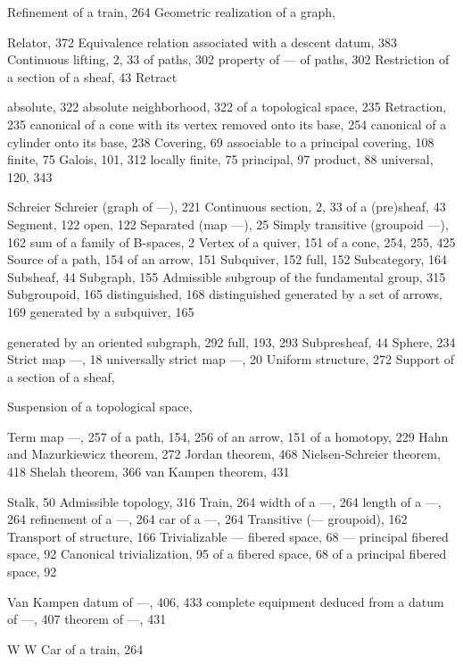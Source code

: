 
Refinement of a train, 264 Geometric realization of a graph,

Relator, 372 Equivalence relation associated with a descent datum, 383 Continuous lifting, 2, 33 of paths, 302 property of --- of paths, 302 Restriction of a section of a sheaf, 43 Retract

absolute, 322 absolute neighborhood, 322 of a topological space, 235 Retraction, 235 canonical of a cone with its vertex removed onto its base, 254 canonical of a cylinder onto its base, 238 Covering, 69 associable to a principal covering, 108 finite, 75 Galois, 101, 312 locally finite, 75 principal, 97 product, 88 universal, 120, 343


Schreier Schreier (graph of ---), 221 Continuous section, 2, 33 of a (pre)sheaf, 43 Segment, 122 open, 122 Separated (map ---), 25 Simply transitive (groupoid ---), 162 sum of a family of B-spaces, 2 Vertex of a quiver, 151 of a cone, 254, 255, 425 Source of a path, 154 of an arrow, 151 Subquiver, 152 full, 152 Subcategory, 164 Subsheaf, 44 Subgraph, 155 Admissible subgroup of the fundamental group, 315 Subgroupoid, 165 distinguished, 168 distinguished generated by a set of arrows, 169 generated by a subquiver, 165

generated by an oriented subgraph, 292 full, 193, 293 Subpresheaf, 44 Sphere, 234 Strict map ---, 18 universally strict map ---, 20 Uniform structure, 272 Support of a section of a sheaf,

Suspension of a topological space,


Term map ---, 257 of a path, 154, 256 of an arrow, 151 of a homotopy, 229 Hahn and Mazurkiewicz theorem, 272 Jordan theorem, 468 Nielsen-Schreier theorem, 418 Shelah theorem, 366 van Kampen theorem, 431

Stalk, 50 Admissible topology, 316 Train, 264 width of a ---, 264 length of a ---, 264 refinement of a ---, 264 car of a ---, 264 Transitive (--- groupoid), 162 Transport of structure, 166 Trivializable --- fibered space, 68 --- principal fibered space, 92 Canonical trivialization, 95 of a fibered space, 68 of a principal fibered space, 92


Van Kampen datum of ---, 406, 433 complete equipment deduced from a datum of ---, 407 theorem of ---, 431

W W Car of a train, 264
\relax{}
